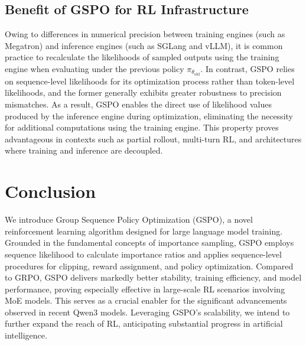 \subsection{Benefit of GSPO for RL Infrastructure}

Owing to differences in numerical precision between training engines (such as Megatron) and inference engines (such as SGLang and vLLM), it is common practice to recalculate the likelihoods of sampled outputs using the training engine when evaluating under the previous policy $\pi_{\theta_\text{old}}$. In contrast, GSPO relies on sequence-level likelihoods for its optimization process rather than token-level likelihoods, and the former generally exhibits greater robustness to precision mismatches. As a result, GSPO enables the direct use of likelihood values produced by the inference engine during optimization, eliminating the necessity for additional computations using the training engine. This property proves advantageous in contexts such as partial rollout, multi-turn RL, and architectures where training and inference are decoupled.

\section{Conclusion}

We introduce Group Sequence Policy Optimization (GSPO), a novel reinforcement learning algorithm designed for large language model training. Grounded in the fundamental concepts of importance sampling, GSPO employs sequence likelihood to calculate importance ratios and applies sequence-level procedures for clipping, reward assignment, and policy optimization. Compared to GRPO, GSPO delivers markedly better stability, training efficiency, and model performance, proving especially effective in large-scale RL scenarios involving MoE models. This serves as a crucial enabler for the significant advancements observed in recent Qwen3 models. Leveraging GSPO's scalability, we intend to further expand the reach of RL, anticipating substantial progress in artificial intelligence.


